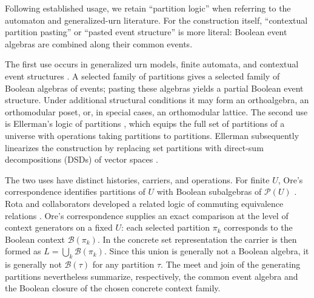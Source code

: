 \documentclass[aps,pra,reprint,nofootinbib]{revtex4-2}
\newcommand{\Pow}{\mathcal{P}}
\newcommand{\BA}{\mathcal{B}}
\begin{document}
Following established usage, we retain ``partition logic'' when referring to
the automaton and generalized-urn literature.  For the construction itself,
``contextual partition pasting'' or ``pasted event structure'' is more literal:
Boolean event algebras are combined along their common events.

The first use occurs in generalized urn models, finite automata, and
contextual event structures
\cite{wright,schaller-95,dvur-pul-svo,svozil-2001-eua}.  A selected family
of partitions gives a selected family of Boolean algebras of events; pasting
these algebras yields a partial Boolean event structure.  Under additional
structural conditions it may form an orthoalgebra, an orthomodular poset, or,
in special cases, an orthomodular lattice.  The second use is Ellerman's logic
of partitions
\cite{ellerman-2010-partition-logic,ellerman-2014-introduction,ellerman-2019-graph-partitions}, which equips the full set of
partitions of a universe with operations taking partitions to partitions.
Ellerman subsequently linearizes the construction by replacing set
partitions with direct-sum decompositions (DSDs) of vector spaces
\cite{ellerman-2018-dsd-quantum-logic}.

The two uses have distinct histories, carriers, and operations.  For finite
$U$, Ore's correspondence identifies partitions of $U$ with Boolean
subalgebras of $\Pow(U)$ \cite{ore-1942-equivalence}.  Rota and collaborators
developed a related logic of commuting equivalence relations
\cite{finberg-mainetti-rota-1996}.  Ore's correspondence supplies an exact
comparison at the level of context generators on a fixed $U$: each selected
  partition $\pi_k$ corresponds to the Boolean context $\BA(\pi_k)$.  In the
  concrete set representation the carrier is then formed as
  $L=\bigcup_k\BA(\pi_k)$.  Since this union is
generally not a Boolean algebra, it is generally not $\BA(\tau)$ for any
partition $\tau$.  The meet and join of the generating partitions nevertheless
summarize, respectively, the common
event algebra and the Boolean closure of the chosen concrete context family.
\end{document}
